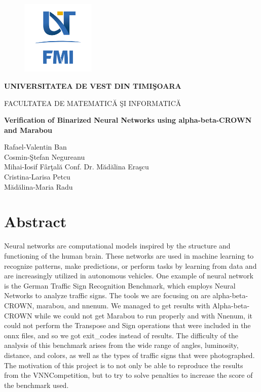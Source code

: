 \documentclass[12pt,a4paper]{report}
\newcommand\tab[1][5mm]{\hspace*{#1}}
\begin{document}
\thispagestyle{empty}
\begin{center}
\begin{figure}[h!]
\vspace{-20pt}
\begin{center}
\includegraphics[width=100pt]{FMI-03.png}
\end{center}
\end{figure}

{\large{\bf UNIVERSITATEA DE VEST DIN TIMI\c SOARA

FACULTATEA DE MATEMATIC\u A \c SI INFORMATIC\u A}}

\vspace{65pt}
{\huge {\bf Verification of Binarized Neural Networks using alpha-beta-CROWN and Marabou}}

\vspace{65pt}
\end{center}

\noindent Rafael-Valentin Ban\\
\noindent Cosmin-\c Stefan Negureanu\\
\noindent Mihai-Iosif F\^{a}r\c tal\u a \hfill Conf. Dr. M\u ad\u alina Era\c scu\\
\noindent Cristina-Larisa Petcu\\
\noindent M\u ad\u alina-Maria Radu\\

\section*{Abstract}
\tab Neural networks are computational models inspired by the structure and functioning of the human brain. These networks are used in machine learning to recognize patterns, make predictions, or perform tasks by learning from data and are increasingly utilized in autonomous vehicles. 
One  example of  neural network is the German Traffic Sign Recognition Benchmark, which employs Neural Networks to analyze traffic signs. The tools we are focusing on are alpha-beta-CROWN, marabou, and nnenum. We managed to get results with Alpha-beta-CROWN while we could not  get Marabou to run properly and with Nnenum, it could not perform the Transpose and Sign operations that were included in the onnx files, and so we got exit\_codes instead of results.  The difficulty of the analysis of this benchmark arises from the wide range of angles, luminosity, distance, and colors, as well as the types of traffic signs that were photographed. The motivation of this project is to not only be able to reproduce the results from the VNNCompetition, but to try to solve penalties to increase the score of the benchmark used.
\end{document}
